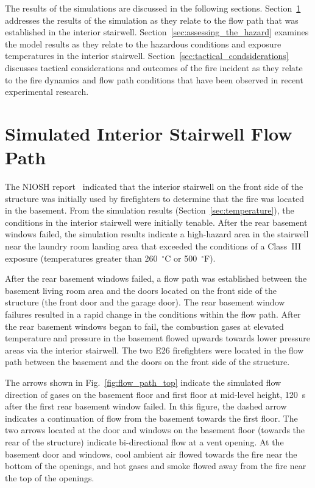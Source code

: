 \documentclass[12pt,oneside]{book}
\begin{document}
The results of the simulations are discussed in the following sections. Section~\ref{sec:simulated_flow_path} addresses the results of the simulation as they relate to the flow path that was established in the interior stairwell. Section~\ref{sec:assessing_the_hazard} examines the model results as they relate to the hazardous conditions and exposure temperatures in the interior stairwell. Section~\ref{sec:tactical_condsiderations} discusses tactical considerations and outcomes of the fire incident as they relate to the fire dynamics and flow path conditions that have been observed in recent experimental research.

\section{Simulated Interior Stairwell Flow Path}
\label{sec:simulated_flow_path}

The NIOSH report~\cite{NIOSH:Bowyer2} indicated that the interior stairwell on the front side of the structure was initially used by firefighters to determine that the fire was located in the basement. From the simulation results (Section~\ref{sec:temperature}), the conditions in the interior stairwell were initially tenable. After the rear basement windows failed, the simulation results indicate a high-hazard area in the stairwell near the laundry room landing area that exceeded the conditions of a Class~III exposure (temperatures greater than 260~$^{\circ}$C or 500~$^{\circ}$F).

After the rear basement windows failed, a flow path was established between the basement living room area and the doors located on the front side of the structure (the front door and the garage door). The rear basement window failures resulted in a rapid change in the conditions within the flow path. After the rear basement windows began to fail, the combustion gases at elevated temperature and pressure in the basement flowed upwards towards lower pressure areas via the interior stairwell. The two E26 firefighters were located in the flow path between the basement and the doors on the front side of the structure.

The arrows shown in Fig.~\ref{fig:flow_path_top} indicate the simulated flow direction of gases on the basement floor and first floor at mid-level height, 120~s after the first rear basement window failed. In this figure, the dashed arrow indicates a continuation of flow from the basement towards the first floor. The two arrows located at the door and windows on the basement floor (towards the rear of the structure) indicate bi-directional flow at a vent opening. At the basement door and windows, cool ambient air flowed towards the fire near the bottom of the openings, and hot gases and smoke flowed away from the fire near the top of the openings.
\end{document}
